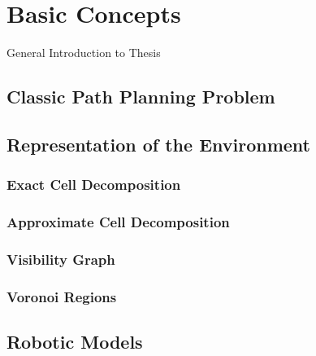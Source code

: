 \chapter{Basic Concepts}\label{ch:introductionplanning}
General Introduction to Thesis

\section{Classic Path Planning Problem}\label{sec:basic}

\section{Representation of the Environment}\label{sec:representation}
\subsection{Exact Cell Decomposition}\label{sec:exactcelldecomposition}
\subsection{Approximate Cell Decomposition}\label{sec:approxcelldecomposition}
\subsection{Visibility Graph}\label{sec:visgraph}
\subsection{Voronoi Regions}\label{sec:voronoi}

\section{Robotic Models}\label{sec:model}




